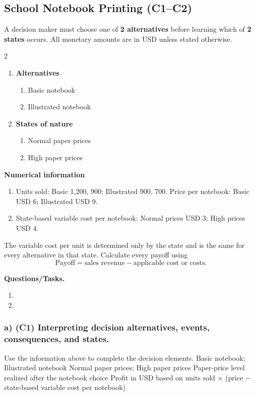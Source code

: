 \subsection{School Notebook Printing (C1--C2)}
\label{sec:problem5-school-notebook-printing-c1-c2}
A decision maker must choose one of \textbf{2 alternatives} before learning which of \textbf{2 states} occurs. All monetary amounts are in USD unless stated otherwise.
\begin{multicols}{2}
\begin{enumerate}[label=\arabic*.]
 \item \textbf{Alternatives}
 \begin{enumerate}[label=\roman*)]
  \item Basic notebook
  \item Illustrated notebook
 \end{enumerate}
 \item \textbf{States of nature}
 \begin{enumerate}[label=\roman*)]
  \item Normal paper prices
  \item High paper prices
 \end{enumerate}
\end{enumerate}
\end{multicols}
 \textbf{Numerical information}
 \begin{enumerate}[label=\roman*)]
  \item Units sold: Basic 1,200, 900; Illustrated 900, 700. Price per notebook: Basic USD 6; Illustrated USD 9.
  \item State-based variable cost per notebook: Normal prices USD 3; High prices USD 4.
 \end{enumerate}
The variable cost per unit is determined only by the state and is the same for every alternative in that state. Calculate every payoff using
\[
 \text{Payoff}=\text{sales revenue}-\text{applicable cost or costs}.
\]

\textbf{Questions/Tasks.}
\begin{enumerate}[label=\textbf{\alph*)}]
 \item {}
 \item {}
\end{enumerate}
\subsubsection*{a) \textbf{(C1)} Interpreting decision alternatives, events, consequences, and states.}
\label{subsec:problem5-school-notebook-printing-c1}
Use the information above to complete the decision elements.
\DecisionElementsTable
{Basic notebook; Illustrated notebook}
{Normal paper prices; High paper prices}
{Paper-price level realized after the notebook choice}
{Profit in USD based on units sold $\times$ (price $-$ state-based variable cost per notebook)}
